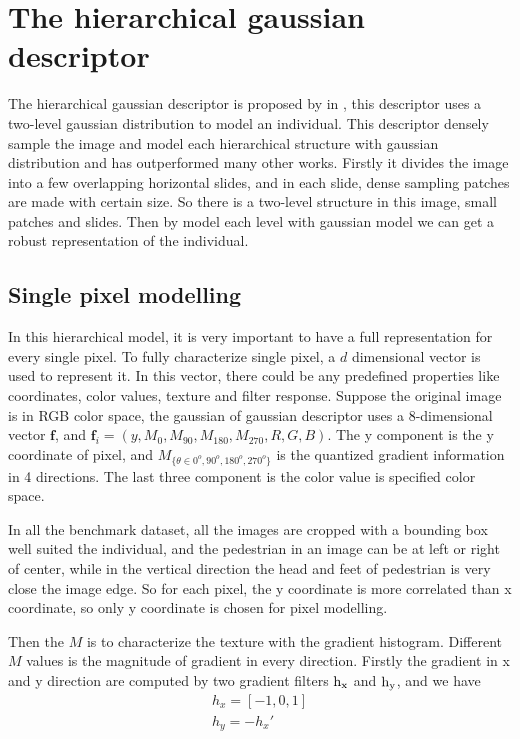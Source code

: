\section{The hierarchical gaussian descriptor}

The hierarchical gaussian descriptor is proposed by in  \cite{GOGpaper}, this descriptor uses a two-level gaussian distribution to model an individual. This descriptor densely sample the image and model each hierarchical structure with gaussian distribution and has outperformed many other works. Firstly it divides the image into a few overlapping horizontal slides, and in each slide, dense sampling patches are made with certain size. So there is a  two-level structure in this image, small patches and slides. Then by model each level with gaussian model we can get a robust representation of the individual.
\subsection{Single pixel modelling}

In this hierarchical model, it is very important to have a full representation for every single pixel. To fully characterize single pixel, a $d$ dimensional vector is used to represent it. In this vector, there could be any predefined properties like coordinates, color values, texture and filter response. Suppose the original image is in RGB color space, the gaussian of gaussian descriptor uses a 8-dimensional vector $\textbf{f}$, and 
$\bm{f}_i = (y,M_0,M_{90},M_{180},M_{270},R,G,B)$.
The y component is the y coordinate of pixel, and $M_{\{{\theta}\in{0^o,90^o,180^o,270^o}\}}$ is the quantized gradient information in 4 directions. The last three component is the color value is specified color space.

In all the benchmark dataset, all the images are cropped with a bounding box well suited the individual, and the pedestrian in an image can be at left or right of center, while in the vertical direction the head and feet of pedestrian is very close the image edge. So for each pixel, the y coordinate is more correlated than x coordinate, so only y coordinate is chosen for pixel modelling. 

Then the $M$ is to characterize the texture with the gradient histogram. Different $M$ values is the magnitude of gradient in every direction. 
Firstly the gradient in x and y direction are computed by two gradient filters $\rm{h}_x$ and $\rm{h}_y$, and we have 
\begin{equation}
\begin{aligned}
h_x = [-1, 0, 1]\\
h_y = -h_x'
\end{aligned}
\end{equation}

